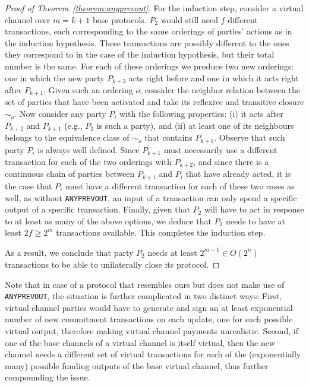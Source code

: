 \begin{proof}[Proof of Theorem~\ref{theorem:anyprevout}]
    For the induction step, consider a virtual channel over $m = k + 1$ base
    protocols. $P_2$ would still need $f$ different transactions, each
    corresponding to the same orderings of parties' actions as in the induction
    hypothesis. These transactions are possibly different to the ones they
    correspond to in the case of the induction hypothesis, but their total
    number is the same. For each of these orderings we produce two new
    orderings: one in which the new party $P_{k+2}$ acts right before and one in
    which it acts right after $P_{k+1}$.  Given such an ordering $o$, consider the
    neighbor relation between the set of parties that have been activated 
    and take its reflexive and transitive closure $\sim_o$. 
    Now consider any party $P_i$ with the following properties: 
    (i) it acts after $P_{k+2}$ and $P_{k+1}$ (e.g., $P_2$ is such a party), and
    (ii)  at least one of its neighbours belongs to the equivalence class of 
    $\sim_o$ that contains $P_{k+1}$. Observe that such party $P_i$ is always
    well defined. 
    Since $P_{k+1}$ must necessarily use a different transaction for each of the
    two orderings with $P_{k+2}$, and since there is a continuous chain of
    parties between $P_{k+1}$ and $P_i$ that have already acted, it is the case
    that $P_i$ must have a different transaction for each of these two cases as
    well, as without \texttt{ANYPREVOUT}, an input of a transaction can only
    spend a specific output of a specific transaction.  Finally, 
    given that $P_2$ will have to act in response to at least as many of the above
    options, we deduce that $P_2$ needs to have at
    least $2f\geq 2^{m}$ transactions available. This completes the induction step.

    As a result, we conclude that party $P_2$ needs at least
    $2^{m-1} \in O(2^n)$ transactions to be
    able to unilaterally close its protocol.  
  \end{proof}

  Note that in case of a protocol that resembles ours but does not make use of
  \texttt{ANYPREVOUT}, the situation is further complicated in two distinct
  ways: First, virtual channel parties would have to generate and sign an at
  least exponential number of new commitment transactions on each update, one
  for each possible virtual output, therefore making virtual channel payments
  unrealistic. Second, if one of the base channels of a virtual channel is
  itself virtual, then the new channel needs a different set of virtual
  transactions for each of the (exponentially many) possible funding outputs of
  the base virtual channel, thus further compounding the issue.
 
